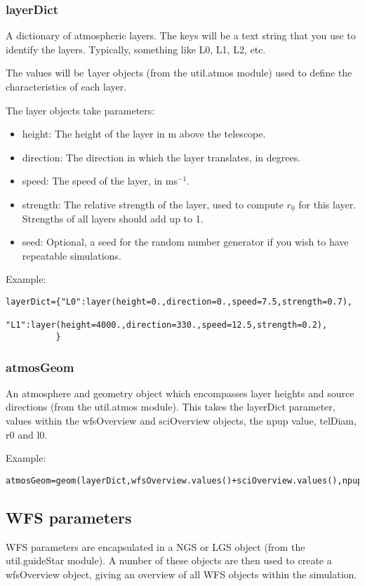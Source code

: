\documentclass{article}
\begin{document}
\subsubsection{layerDict}
A dictionary of atmospheric layers.  The keys will be a text string
that you use to identify the layers.  Typically, something like L0,
L1, L2, etc.

The values will be {\texttt layer} objects (from the util.atmos
module) used to define the characteristics of each layer.  

The layer objects take parameters:
\begin{itemize}
\item height: The height of the layer in m above the telescope.
\item direction: The direction in which the layer translates, in
  degrees.
\item speed: The speed of the layer, in ms$^{-1}$.
\item strength: The relative strength of the layer, used to compute
  $r_0$ for this layer.  Strengths of all layers should add up to 1.
\item seed: Optional, a seed for the random number generator if you
  wish to have repeatable simulations.
\end{itemize}

Example:
\begin{verbatim}
layerDict={"L0":layer(height=0.,direction=0.,speed=7.5,strength=0.7),
           "L1":layer(height=4000.,direction=330.,speed=12.5,strength=0.2),
          }
\end{verbatim}

\subsubsection{atmosGeom}
An atmosphere and geometry object which encompasses layer heights and
source directions (from the util.atmos module).  This takes the
layerDict parameter, values within the wfsOverview and sciOverview
objects, the npup value, telDiam, r0 and l0.  

Example:
\begin{verbatim}
atmosGeom=geom(layerDict,wfsOverview.values()+sciOverview.values(),npup,npup,telDiam,r0,l0)
\end{verbatim}


\subsection{WFS parameters}
WFS parameters are encapsulated in a NGS or LGS object (from the
util.guideStar module).  A number of these objects are then used to
create a wfsOverview object, giving an overview of all WFS objects
within the simulation.
\end{document}
